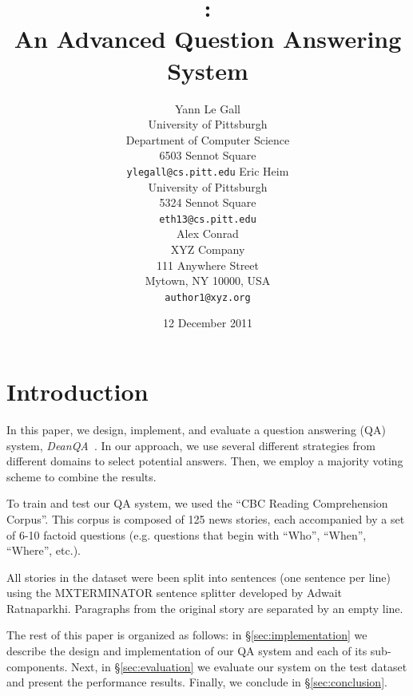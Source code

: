 \documentclass[11pt,letterpaper]{article}
\title{\name: \\An Advanced Question Answering System}
\author{
	Yann Le Gall\\
    University of Pittsburgh\\	
	Department of Computer Science\\
	6503 Sennot Square\\
    {\tt ylegall@cs.pitt.edu}
\And
	Eric Heim\\
    University of Pittsburgh\\	
	5324 Sennot Square\\
    {\tt eth13@cs.pitt.edu}
	\\
\And
	Alex Conrad\\
    XYZ Company\\
    111 Anywhere Street\\
    Mytown, NY 10000, USA\\
    {\tt author1@xyz.org}
}
\date{12 December 2011}
\newcommand{\name}{\emph{DeanQA~}}
\begin{document}
\maketitle





\section{Introduction}
\label{sec:intro}

In this paper, we design, implement, and evaluate a question answering
(QA) system, \name. In our approach, we use several different strategies from
different domains to select potential answers. Then, we employ a
majority voting scheme to combine the results.

To train and test our QA system, we used the ``CBC Reading
Comprehension Corpus''. This corpus is composed of 125 news stories,
each accompanied by a set of 6-10 factoid questions (e.g. questions
that begin with ``Who'', ``When'', ``Where'', etc.).

All stories in the dataset were been split into sentences (one
sentence per line) using the MXTERMINATOR sentence splitter developed
by Adwait Ratnaparkhi.  Paragraphs from the original story are
separated by an empty line. 

The rest of this paper is organized as follows: in
\S\ref{sec:implementation} we describe the design and implementation
of our QA system and each of its sub-components. Next, in
\S\ref{sec:evaluation} we evaluate our system on the test dataset and
present the performance results. Finally, we conclude in
\S\ref{sec:conclusion}.
\end{document}
